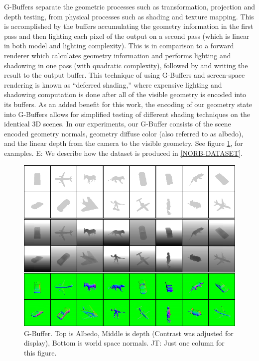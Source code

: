 \documentclass[10pt,twocolumn,letterpaper]{article}
\newcommand{\tompson}[1]{{\color{green} JT: #1}}
\newcommand{\edit}[1]{{\color{red} E: #1}}
\begin{document}
G-Buffers separate the geometric processes such as transformation, projection and depth testing, from physical processes such as shading and texture mapping. This is accomplished by the buffers accumulating the geometry information in the first pass and then lighting each pixel of the output on a second pass (which is linear in both model and lighting complexity).  This is in comparison to a forward renderer which calculates geometry information and performs lighting and shadowing in one pass (with quadratic complexity), followed by and writing the result to the output buffer.  
This technique of using G-Buffers and screen-space rendering is known as ``deferred shading,'' where expensive lighting and shadowing computation is done after all of the visible geometry is encoded into its buffers.
 As an added benefit for this work, the encoding of our geometry state into G-Buffers allows for simplified testing of different shading techniques on the identical 3D scenes.
In our experiments, our G-Buffer consists of the scene encoded geometry normals, geometry diffuse color (also referred to as albedo), and the linear depth from the camera to the visible geometry.  See figure \ref{fig:GBUFFER_ALBEDO}, for examples. \edit{We describe how the dataset is produced in \ref{NORB-DATASET}}.

\begin{figure}[h!]
\centering
\includegraphics[width=0.8\columnwidth]{./assets/synth_gbuffer_framed.png}
\caption{G-Buffer. Top is Albedo, Middle is depth (Contrast was adjusted for display), Bottom is world space normals. \tompson{Just one column for this figure.}}
\label{fig:GBUFFER_ALBEDO}
\end{figure}
\end{document}
